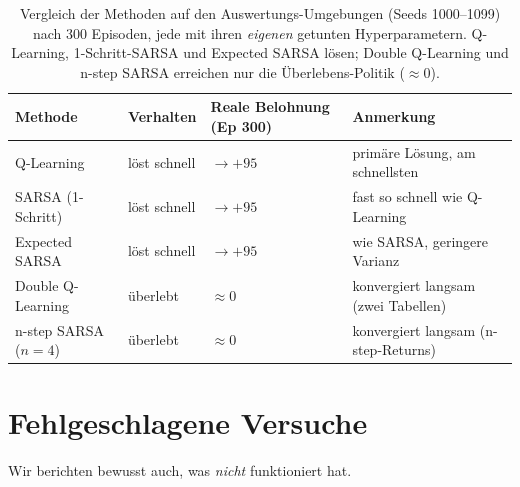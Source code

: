 \documentclass[11pt,a4paper]{article}
\begin{document}
\begin{table}[h]
\centering
\small
\begin{tabular}{@{}llll@{}}
\toprule
\textbf{Methode} & \textbf{Verhalten} & \textbf{Reale Belohnung (Ep 300)} & \textbf{Anmerkung}\\
\midrule
Q-Learning        & l\"ost schnell & $\rightarrow +95$ & prim\"are L\"osung, am schnellsten\\
SARSA (1-Schritt) & l\"ost schnell & $\rightarrow +95$ & fast so schnell wie Q-Learning\\
Expected SARSA    & l\"ost schnell & $\rightarrow +95$ & wie SARSA, geringere Varianz\\
Double Q-Learning & \"uberlebt     & $\approx 0$ & konvergiert langsam (zwei Tabellen)\\
n-step SARSA ($n{=}4$) & \"uberlebt & $\approx 0$ & konvergiert langsam (n-step-Returns)\\
\bottomrule
\end{tabular}
\caption{Vergleich der Methoden auf den Auswertungs-Umgebungen (Seeds 1000--1099) nach
         300 Episoden, jede mit ihren \emph{eigenen} getunten Hyperparametern.
         Q-Learning, 1-Schritt-SARSA und Expected SARSA l\"osen; Double Q-Learning und
         n-step SARSA erreichen nur die \"Uberlebens-Politik ($\approx 0$).}
\end{table}

\section{Fehlgeschlagene Versuche}
Wir berichten bewusst auch, was \emph{nicht} funktioniert hat.
\end{document}
